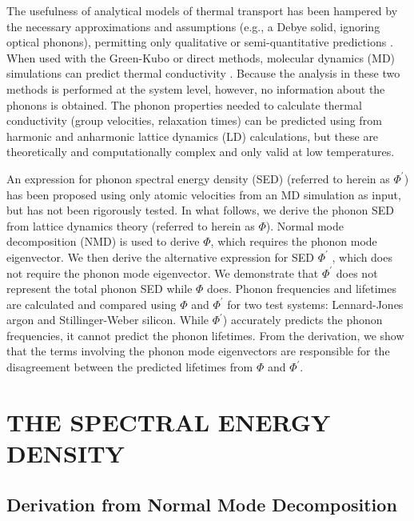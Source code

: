 \documentclass[twocolumn,10pt]{asme2e}
\begin{document}
The usefulness of analytical models of thermal transport has been hampered by
the necessary approximations and assumptions (e.g., a Debye solid, ignoring
optical phonons), permitting only qualitative or semi-quantitative
predictions \cite{callaway1959,holland1963}. When used with the Green-Kubo or
direct methods, molecular dynamics (MD) simulations can predict thermal
conductivity \cite{mcgaughey2004c,landry2008,schelling2002,sellan2010a}.
Because the analysis in these two methods is performed at the system level,
however, no information about the phonons is obtained. The phonon properties
needed to calculate thermal conductivity (group velocities, relaxation times)
can be predicted using from harmonic and anharmonic lattice dynamics (LD)
calculations,\cite{maradudin1962,wallace1972,ladd1986,dove1993,turney2009a}
but these are theoretically and computationally complex and only valid at low
temperatures.

An expression for phonon spectral energy density 
(SED)\cite{marayuma2003,shiomi2006,dekoker2009,thomas2010c} (referred to herein as $\Phi^{'}$) has been proposed using only atomic velocities from an MD simulation as input, but has not been rigorously tested. In what follows, we derive the phonon SED from lattice dynamics
theory (referred to herein as $\Phi$). Normal mode decomposition (NMD)\cite{dove1993} is used to derive $\Phi$, which requires the phonon mode eigenvector. We then derive the alternative expression for SED $\Phi^{'}$ \cite{thomas2010c}, which does not require the phonon mode eigenvector. We demonstrate that $\Phi^{'}$ does not represent the total phonon SED while $\Phi$ does. Phonon frequencies and lifetimes are calculated and compared using $\Phi$ and $\Phi^{'}$ for two test systems: Lennard-Jones argon and Stillinger-Weber silicon. While $\Phi^{'}$) accurately predicts the phonon frequencies, it cannot predict the phonon lifetimes.  From the derivation, we show that the terms involving the phonon mode eigenvectors are responsible for the disagreement between the predicted lifetimes from $\Phi$ and $\Phi^{'}$.

\section*{THE SPECTRAL ENERGY DENSITY}\label{S:SED}

\subsection*{Derivation from Normal Mode Decomposition}\label{SS:derivation}
\end{document}
